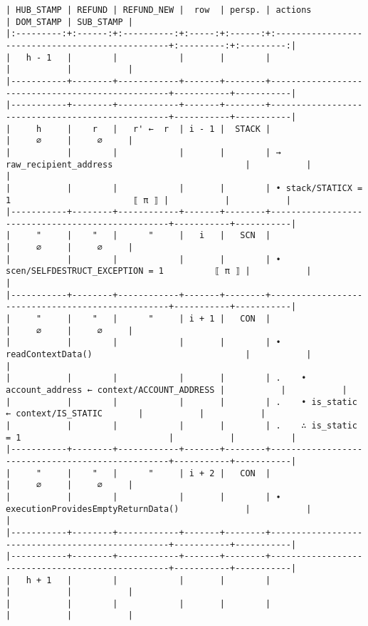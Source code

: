 \documentclass[varwidth=\maxdimen,margin=0.5cm,multi={verbatim}]{standalone}
\begin{document}
\begin{verbatim}
| HUB_STAMP | REFUND | REFUND_NEW |  row  | persp. | actions                                          | DOM_STAMP | SUB_STAMP |
|:---------:+:------:+:----------:+:-----:+:------:+:-------------------------------------------------+:---------:+:---------:|
|   h - 1   |        |            |       |        |                                                  |           |           |
|-----------+--------+------------+-------+--------+--------------------------------------------------+-----------+-----------|
|-----------+--------+------------+-------+--------+--------------------------------------------------+-----------+-----------|
|     h     |    r   |   r' ←  r  | i - 1 |  STACK |                                                  |     ∅     |     ∅     |
|           |        |            |       |        | → raw_recipient_address                          |           |           |
|           |        |            |       |        | • stack/STATICX = 1                        ⟦ π ⟧ |           |           |
|-----------+--------+------------+-------+--------+--------------------------------------------------+-----------+-----------|
|     "     |    "   |      "     |   i   |   SCN  |                                                  |     ∅     |     ∅     |
|           |        |            |       |        | • scen/SELFDESTRUCT_EXCEPTION = 1          ⟦ π ⟧ |           |           |
|-----------+--------+------------+-------+--------+--------------------------------------------------+-----------+-----------|
|     "     |    "   |      "     | i + 1 |   CON  |                                                  |     ∅     |     ∅     |
|           |        |            |       |        | • readContextData()                              |           |           |
|           |        |            |       |        | .    • account_address ← context/ACCOUNT_ADDRESS |           |           |
|           |        |            |       |        | .    • is_static       ← context/IS_STATIC       |           |           |
|           |        |            |       |        | .    ∴ is_static = 1                             |           |           |
|-----------+--------+------------+-------+--------+--------------------------------------------------+-----------+-----------|
|     "     |    "   |      "     | i + 2 |   CON  |                                                  |     ∅     |     ∅     |
|           |        |            |       |        | ∙ executionProvidesEmptyReturnData()             |           |           |
|-----------+--------+------------+-------+--------+--------------------------------------------------+-----------+-----------|
|-----------+--------+------------+-------+--------+--------------------------------------------------+-----------+-----------|
|   h + 1   |        |            |       |        |                                                  |           |           |
|           |        |            |       |        |                                                  |           |           |
\end{verbatim}
\end{document}
